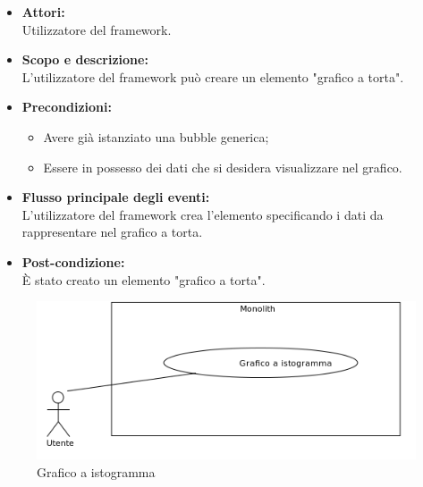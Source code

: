 \begin{itemize}
	\item \textbf{Attori:}
	\\Utilizzatore del framework.
	\item \textbf{Scopo e descrizione:} 
	\\L'utilizzatore del framework può creare un elemento "grafico a torta".
	\item \textbf{Precondizioni:}
	\begin{itemize}
		\item Avere già istanziato una bubble generica;
		\item Essere in possesso dei dati che si desidera visualizzare nel grafico.
	\end{itemize}
	\item \textbf{Flusso principale degli eventi:}
	\\L'utilizzatore del framework crea l'elemento specificando i dati da rappresentare nel grafico a torta.
	\item \textbf{Post-condizione:}
	\\È stato creato un elemento "grafico a torta".
\end{itemize}

\begin{samepage}
\nopagebreak
\begin{figure}[H]
	\centering
	\includegraphics[width=15cm]{../../documenti/AnalisiDeiRequisiti/Diagrammi_img/uc1_29.png}
	\caption{\UCFFCaption{} Grafico a istogramma}
\end{figure}
\end{samepage}


